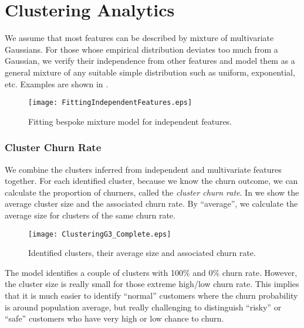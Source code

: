 \documentclass[english,a4,oneside,9pt]{extarticle}
\begin{document}
\section{Clustering Analytics}

We assume that most features can be described by mixture of multivariate Gaussians. For those whose empirical distribution deviates too much from a Gaussian, we verify their independence from other features and model them as a general mixture of any suitable simple distribution such as uniform, exponential, etc. Examples are shown in .

\begin{figure}[!h]
\centering
\vspace*{-3mm}
\texttt{[image: FittingIndependentFeatures.eps]}
\caption{Fitting bespoke mixture model for independent features. }
\label{fig:fitIndependentFeature}
\end{figure}

\vspace*{-3mm}
\subsubsection*{Cluster Churn Rate}

We combine the clusters inferred from independent and multivariate features together. For each identified cluster, because we know the churn outcome, we can calculate the proportion of churners, called the \textit{cluster churn rate}. In  we show the average cluster size and the associated churn rate. By ``average'', we calculate the average size for clusters of the same churn rate.

\begin{figure}[htb]
\centering
\vspace*{-3mm}
\texttt{[image: ClusteringG3\_Complete.eps]}
\vspace*{-3mm}
\caption{Identified clusters, their average size and associated churn rate.}
\label{fig:cluster}
\end{figure}

The model identifies a couple of clusters with 100\% and 0\% churn rate. However, the cluster size is really small for those extreme high/low churn rate. This implies that it is much easier to identify ``normal'' customers where the churn probability is around population average, but really challenging to distinguish ``risky'' or ``safe'' customers who have very high or low chance to churn.
\end{document}
